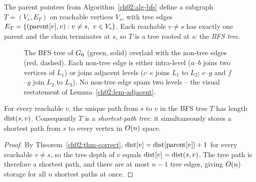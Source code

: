 The parent pointers from Algorithm~\ref{ch02:alg-bfs} define a subgraph
$T=(V_s, E_T)$ on reachable vertices $V_s$, with tree edges
$E_T = \{(\mathrm{parent}[v],v) : v\ne s,\ v \in V_s\}$. Each reachable $v\ne s$ has exactly one
parent and the chain terminates at $s$, so $T$ is a tree rooted at $s$: the
\emph{BFS tree}.

\begin{figure}[H]
\centering
{}
\caption{The BFS tree of $G_0$ (green, solid) overlaid with the non-tree
edges (red, dashed). Each non-tree edge is either intra-level ($a$--$b$ joins
two vertices of $L_1$) or joins adjacent levels ($c$--$e$ joins $L_1$ to $L_2$;
$e$--$g$ and $f$--$g$ join $L_2$ to $L_3$). No non-tree edge spans two levels --
the visual restatement of Lemma~\ref{ch02:lem-adjacent}.}
\label{ch02:fig-tree}
\end{figure}

\begin{proposition}
\label{ch02:prop-treepath}
For every reachable $v$, the unique path from $s$ to $v$ in the BFS tree $T$ has
length $\operatorname{dist}(s,v)$. Consequently $T$ is a \emph{shortest-path tree}: it
simultaneously stores a shortest path from $s$ to every vertex in $O(n)$ space.
\end{proposition}

\begin{proof}
By Theorem~\ref{ch02:thm-correct}, $\operatorname{dist}[v]=\operatorname{dist}[\mathrm{parent}[v]]+1$ for
every reachable $v\ne s$, so the tree depth of $v$ equals $\operatorname{dist}[v]=\operatorname{dist}(s,v)$.
The tree path is therefore a shortest path, and there are at most $n-1$ tree
edges, giving $O(n)$ storage for all $n$ shortest paths at once.
\end{proof}

